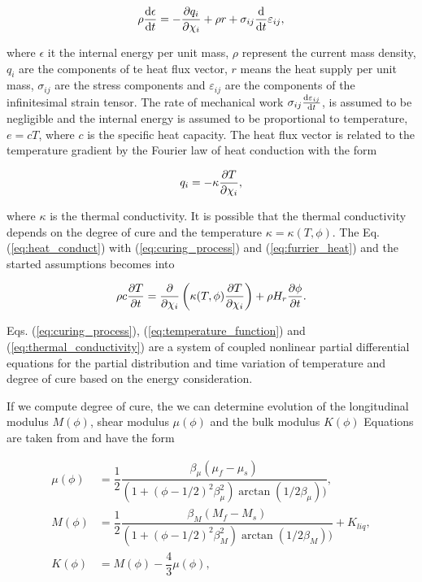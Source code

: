 \begin{equation} \label{eq:heat_conduct}
	\rho \dv{\epsilon}{t} = - \pdv{q_i}{\chi_i} + \rho r + \sigma_{ij} \dv{t}\varepsilon_{ij},
\end{equation}

where $\epsilon$ it the internal energy per unit mass, $\rho$ represent the current mass density, $q_i$ are the components of te heat flux vector, $r$ means the heat supply per unit mass, $\sigma_{ij}$ are the stress components and $\varepsilon_{ij}$ are the components of the infinitesimal strain tensor. 
The rate of mechanical work $\sigma_{ij}\dv{\varepsilon_{ij}}{t} $, is assumed to be negligible and the internal energy is assumed to be proportional to temperature, $e=cT$, where $c$ is the specific heat capacity. The heat flux vector is related to the temperature gradient by the Fourier law of heat conduction with the form

\begin{equation}\label{eq:furrier_heat}
	q_i = - \kappa \pdv{T}{\chi_i},
\end{equation}

where $\kappa$ is the thermal conductivity. It is possible that the thermal conductivity depends on the degree of cure and the temperature $\kappa = \kappa(T, \phi)$. The Eq. (\ref{eq:heat_conduct}) with (\ref{eq:curing_process}) and (\ref{eq:furrier_heat}) and the started assumptions becomes into

\begin{equation}\label{eq:thermal_conductivity}
	\rho c \pdv{T}{t} = \pdv{\chi_i} \left( \kappa(T, \phi)  \pdv{T}{\chi_i} \right) + \rho H_r \pdv{\phi}{t}.
\end{equation}
 
 Eqs. (\ref{eq:curing_process}), (\ref{eq:temperature_function}) and (\ref{eq:thermal_conductivity}) are a system of coupled nonlinear partial differential equations for the partial distribution and time variation of temperature and degree of cure based on the energy consideration. 
 
 If we compute degree of cure, the we can determine evolution of the longitudinal modulus $M(\phi)$, shear modulus $\mu(\phi)$ and the bulk modulus $K(\phi)$ Equations are taken from \cite{heinrich2012generation} and have the form
 
 \begin{align}
 	\mu(\phi) &= \dfrac{1}{2} \dfrac{\beta_\mu ( \mu_f - \mu_s)}{\left(1+(\phi-1/2)^2 \beta_\mu^2\right) \arctan(1/2\beta_\mu))}, \\
 	M(\phi) &= \dfrac{1}{2} \dfrac{\beta_M ( M_f - M_s)}{\left(1+(\phi-1/2)^2 \beta_M^2\right) \arctan(1/2\beta_M))} + K_{liq}, \\
 	K(\phi) &= M(\phi) - \dfrac{4}{3}\mu(\phi),
 \end{align}
 
